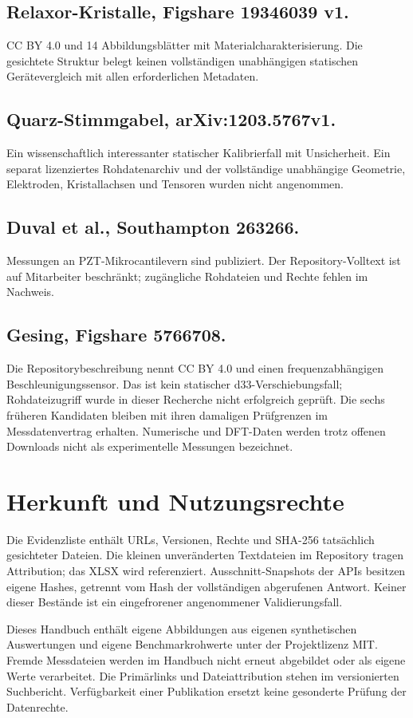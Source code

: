 \subsection*{Relaxor-Kristalle, Figshare 19346039 v1.}
CC BY 4.0 und 14 Abbildungsblätter mit Materialcharakterisierung.
Die gesichtete Struktur belegt keinen vollständigen unabhängigen statischen
Gerätevergleich mit allen erforderlichen Metadaten.
\subsection*{Quarz-Stimmgabel, arXiv:1203.5767v1.}
Ein wissenschaftlich interessanter statischer Kalibrierfall mit Unsicherheit.
Ein separat lizenziertes Rohdatenarchiv und der vollständige unabhängige
Geometrie, Elektroden, Kristallachsen und Tensoren wurden nicht angenommen.
\subsection*{Duval et al., Southampton 263266.}
Messungen an PZT-Mikrocantilevern sind publiziert. Der Repository-Volltext ist
auf Mitarbeiter beschränkt; zugängliche Rohdateien und Rechte fehlen im Nachweis.
\subsection*{Gesing, Figshare 5766708.}
Die Repositorybeschreibung nennt CC BY 4.0 und einen frequenzabhängigen
Beschleunigungssensor. Das ist kein statischer d33-Verschiebungsfall;
Rohdateizugriff wurde in dieser Recherche nicht erfolgreich geprüft.
Die sechs früheren Kandidaten bleiben mit ihren damaligen Prüfgrenzen im
Messdatenvertrag erhalten. Numerische und DFT-Daten werden trotz offenen
Downloads nicht als experimentelle Messungen bezeichnet.

\section{Herkunft und Nutzungsrechte}
Die Evidenzliste  enthält
URLs, Versionen, Rechte und SHA-256 tatsächlich gesichteter Dateien.
Die kleinen unveränderten Textdateien im Repository tragen Attribution;
das XLSX wird referenziert. Ausschnitt-Snapshots der APIs besitzen eigene
Hashes, getrennt vom Hash der vollständigen abgerufenen Antwort.
Keiner dieser Bestände ist ein eingefrorener angenommener Validierungsfall.

Dieses Handbuch enthält eigene Abbildungen aus eigenen synthetischen
Auswertungen und eigene Benchmarkrohwerte unter der Projektlizenz MIT.
Fremde Messdateien werden im Handbuch nicht erneut abgebildet oder als
eigene Werte verarbeitet. Die Primärlinks und Dateiattribution stehen im
versionierten Suchbericht. Verfügbarkeit einer Publikation ersetzt keine
gesonderte Prüfung der Datenrechte.

